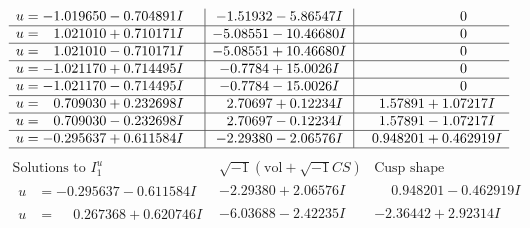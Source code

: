 \documentclass[1p]{elsarticle_modified}
\theoremstyle{definition}
\newcommand{\I}{\sqrt{-1}}
\begin{document}
$$\begin{array}{c|c|c}
\begin{aligned}
u &= -1.019650 - 0.704891 I\end{aligned}
 & -1.51932 - 5.86547 I & \phantom{-0.000000 } 0 \\ \hline\begin{aligned}
u &= \phantom{-}1.021010 + 0.710171 I\end{aligned}
 & -5.08551 - 10.46680 I & \phantom{-0.000000 } 0 \\ \hline\begin{aligned}
u &= \phantom{-}1.021010 - 0.710171 I\end{aligned}
 & -5.08551 + 10.46680 I & \phantom{-0.000000 } 0 \\ \hline\begin{aligned}
u &= -1.021170 + 0.714495 I\end{aligned}
 & -0.7784 + 15.0026 I & \phantom{-0.000000 } 0 \\ \hline\begin{aligned}
u &= -1.021170 - 0.714495 I\end{aligned}
 & -0.7784 - 15.0026 I & \phantom{-0.000000 } 0 \\ \hline\begin{aligned}
u &= \phantom{-}0.709030 + 0.232698 I\end{aligned}
 & \phantom{-}2.70697 + 0.12234 I & \phantom{-}1.57891 + 1.07217 I \\ \hline\begin{aligned}
u &= \phantom{-}0.709030 - 0.232698 I\end{aligned}
 & \phantom{-}2.70697 - 0.12234 I & \phantom{-}1.57891 - 1.07217 I \\ \hline\begin{aligned}
u &= -0.295637 + 0.611584 I\end{aligned}
 & -2.29380 - 2.06576 I & \phantom{-}0.948201 + 0.462919 I\\
 \hline 
 \end{array}$$\newpage$$\begin{array}{c|c|c}  
\text{Solutions to }I^u_{1}& \I (\text{vol} + \sqrt{-1}CS) & \text{Cusp shape}\\
 \hline 
\begin{aligned}
u &= -0.295637 - 0.611584 I\end{aligned}
 & -2.29380 + 2.06576 I & \phantom{-}0.948201 - 0.462919 I \\ \hline\begin{aligned}
u &= \phantom{-}0.267368 + 0.620746 I\end{aligned}
 & -6.03688 - 2.42235 I & -2.36442 + 2.92314 I \\ \hline\begin{aligned}

\end{aligned}
\end{array}$$
\end{document}
